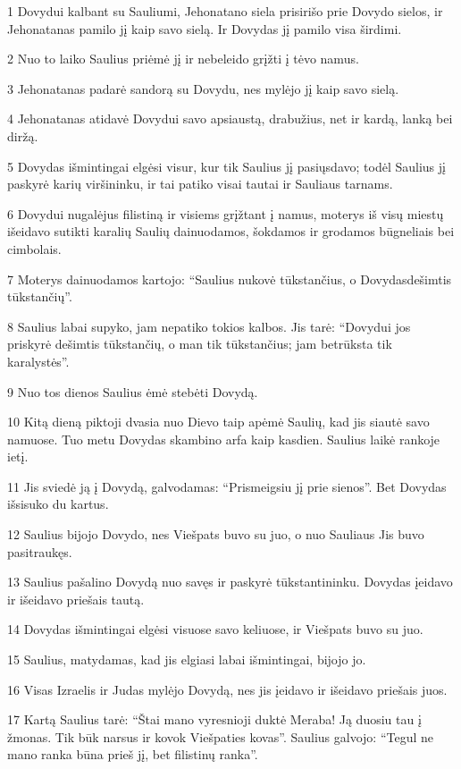 \par 1 Dovydui kalbant su Sauliumi, Jehonatano siela prisirišo prie Dovydo sielos, ir Jehonatanas pamilo jį kaip savo sielą. Ir Dovydas jį pamilo visa širdimi. 
\par 2 Nuo to laiko Saulius priėmė jį ir nebeleido grįžti į tėvo namus. 
\par 3 Jehonatanas padarė sandorą su Dovydu, nes mylėjo jį kaip savo sielą. 
\par 4 Jehonatanas atidavė Dovydui savo apsiaustą, drabužius, net ir kardą, lanką bei diržą. 
\par 5 Dovydas išmintingai elgėsi visur, kur tik Saulius jį pasiųsdavo; todėl Saulius jį paskyrė karių viršininku, ir tai patiko visai tautai ir Sauliaus tarnams. 
\par 6 Dovydui nugalėjus filistiną ir visiems grįžtant į namus, moterys iš visų miestų išeidavo sutikti karalių Saulių dainuodamos, šokdamos ir grodamos būgneliais bei cimbolais. 
\par 7 Moterys dainuodamos kartojo: “Saulius nukovė tūkstančius, o Dovydas­dešimtis tūkstančių”. 
\par 8 Saulius labai supyko, jam nepatiko tokios kalbos. Jis tarė: “Dovydui jos priskyrė dešimtis tūkstančių, o man tik tūkstančius; jam betrūksta tik karalystės”. 
\par 9 Nuo tos dienos Saulius ėmė stebėti Dovydą. 
\par 10 Kitą dieną piktoji dvasia nuo Dievo taip apėmė Saulių, kad jis siautė savo namuose. Tuo metu Dovydas skambino arfa kaip kasdien. Saulius laikė rankoje ietį. 
\par 11 Jis sviedė ją į Dovydą, galvodamas: “Prismeigsiu jį prie sienos”. Bet Dovydas išsisuko du kartus. 
\par 12 Saulius bijojo Dovydo, nes Viešpats buvo su juo, o nuo Sauliaus Jis buvo pasitraukęs. 
\par 13 Saulius pašalino Dovydą nuo savęs ir paskyrė tūkstantininku. Dovydas įeidavo ir išeidavo priešais tautą. 
\par 14 Dovydas išmintingai elgėsi visuose savo keliuose, ir Viešpats buvo su juo. 
\par 15 Saulius, matydamas, kad jis elgiasi labai išmintingai, bijojo jo. 
\par 16 Visas Izraelis ir Judas mylėjo Dovydą, nes jis įeidavo ir išeidavo priešais juos. 
\par 17 Kartą Saulius tarė: “Štai mano vyresnioji duktė Meraba! Ją duosiu tau į žmonas. Tik būk narsus ir kovok Viešpaties kovas”. Saulius galvojo: “Tegul ne mano ranka būna prieš jį, bet filistinų ranka”. 
